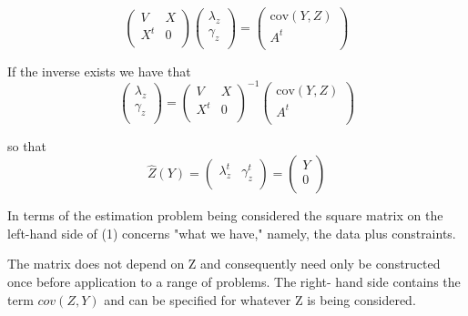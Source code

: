 \documentclass[12pt, a4paper]{article}
\begin{document}
\begin{equation}
\left(
\begin{array}{cc}
V & X \\
X^t & 0 \\
\end{array}
\right)\left(
\begin{array}{c}
\lambda_{z}\\
\gamma_z \\
\end{array}
\right)=\left(
\begin{array}{c}
\mbox{cov}(Y,Z)\\
A^{t} \\
\end{array}
\right)
\end{equation}


If the inverse exists we have that
\begin{equation}
\left(
\begin{array}{c}
\lambda_{z}\\
\gamma_z \\
\end{array}
\right)=\left(
\begin{array}{cc}
V & X \\
X^t & 0 \\
\end{array}
\right) ^{-1}\left(
\begin{array}{c}
\mbox{cov}(Y,Z)\\
A^{t} \\
\end{array}
\right)
\end{equation}



so that
\[ \hat{Z}(Y) =
\left(
\begin{array}{cc}
\lambda_{z}^{t}&
\gamma_z^{t} \\
\end{array}
\right)=\left(
\begin{array}{c}
Y \\
0 \\
\end{array}
\right) \]

In terms of the estimation problem being considered the square matrix on the left-hand side of (1) concerns "what we have," namely, the data plus constraints.

The matrix does not depend on Z and consequently need only be constructed once before application to a range of problems. The right- hand side contains the term $cov(Z,Y)$ and can be specified for whatever Z is being considered.
\end{document}
